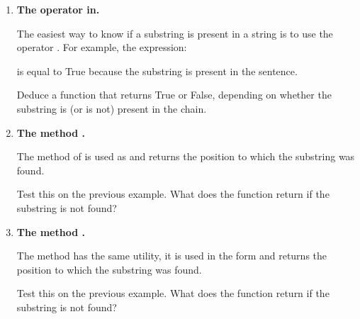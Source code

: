 \documentclass[11pt,class=report,crop=false]{standalone}
\begin{document}





\begin{activite}[Find]


\begin{enumerate}
  \item \textbf{The operator \og{}in\fg{}.}
  
  
  The easiest way to know if a substring is present in a string is to use the operator \og{}\fg{}. For example, the expression: 
  
  is equal to \og{}True\fg{} because the substring  is present in the sentence.
  
  Deduce a function  that returns \og{}True\fg{} or \og{}False\fg{}, depending on whether the substring is (or is not) present in the chain.
  
  \item \textbf{The method .}
  
  
  The  method of \Python{} is used as  and returns the position to which the substring was found. 
  
  Test this on the previous example. What does the function return if the substring is not found?
 
   \item \textbf{The method .}
  
  
  The  method has the same utility, it is used in the form  and returns the position to which the substring was found. 

  Test this on the previous example. What does the function return if the substring is not found?
 

\end{enumerate}
\end{activite}
\end{document}
